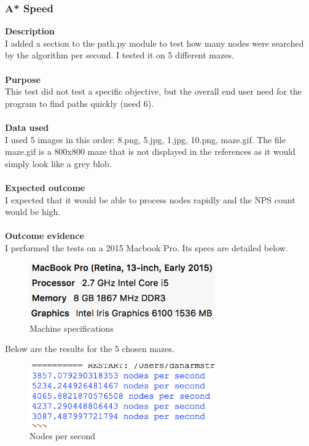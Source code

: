 \documentclass[titlepage]{article}
\begin{document}
\subsubsection{A* Speed}
\textbf{Description}\\
I added a section to the path.py module to test how many nodes were searched by the algorithm per second. I tested it on 5 different mazes.\\\\
\textbf{Purpose}\\
This test did not test a specific objective, but the overall end user need for the program to find paths quickly (need 6).\\\\
\textbf{Data used} \\
I used 5 images in this order: 8.png, 5.jpg, 1.jpg, 10.png, maze.gif. The file maze.gif is a 800x800 maze that is not displayed in the references as it would simply look like a grey blob.\\\\
\textbf{Expected outcome}\\
I expected that it would be able to process nodes rapidly and the NPS count would be high. \\\\
\textbf{Outcome evidence}\\
I performed the tests on a 2015 Macbook Pro. Its specs are detailed below.

\begin{figure}[H]
  \centering
  \includegraphics[width=8cm]{deets.png}
  \caption{Machine specifications}
  \label{fig:dijk}
\end{figure}

Below are the results for the 5 chosen mazes. 

\begin{figure}[H]
  \centering
  \includegraphics[width=8cm]{nps.png}
  \caption{Nodes per second}
  \label{fig:dijk}
\end{figure}
\end{document}

